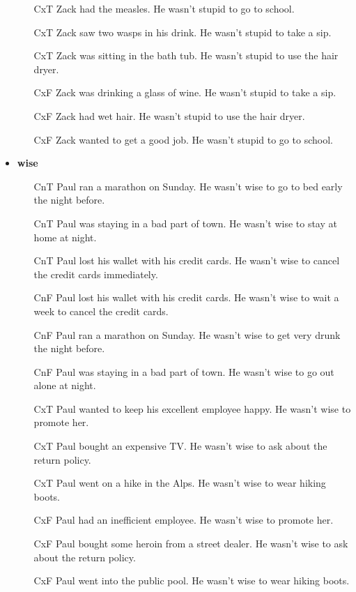 \documentclass[11pt,fleqn]{article}
\newcommand{\6}{\mbox{$[\hspace*{-.6mm}[$}}
\newcommand{\9}{\mbox{$]\hspace*{-.6mm}]$}}
\begin{document}
\begin{itemize}[leftmargin=15pt,itemsep=-1pt]
\begin{enumerate}[leftmargin=15pt,topsep=0pt,itemsep=0pt]
\item[CxT] 	Zack had the measles.	He	wasn't stupid	to go to school.
\item[CxT] 	Zack saw two wasps in his drink.	He	wasn't stupid	to take a sip.
\item[CxT] 	Zack was sitting in the bath tub.	He	wasn't stupid	to use the hair dryer.
\item[CxF] 	Zack was drinking a glass of wine.	He	wasn't stupid	to take a sip.
\item[CxF] 	Zack had wet hair.	He	wasn't stupid	to use the hair dryer.
\item[CxF] 	Zack wanted to get a good job.	He	wasn't stupid	to go to school.

\end{enumerate}

\item {\bf wise}

\begin{enumerate}[leftmargin=15pt,topsep=0pt,itemsep=0pt]


\item[CnT] 	Paul ran a marathon on Sunday.	He	wasn't wise	to go to bed early the night before.
\item[CnT] 	Paul was staying in a bad part of town.	He	wasn't wise	to stay at home at night.
\item[CnT] 	Paul lost his wallet with his credit cards.	He	wasn't wise	to cancel the credit cards immediately.
\item[CnF] 	Paul lost his wallet with his credit cards.	He	wasn't wise	to wait a week to cancel the credit cards.
\item[CnF] 	Paul ran a marathon on Sunday.	He	wasn't wise	to get very drunk the night before.
\item[CnF] 	Paul was staying in a bad part of town.	He	wasn't wise	to go out alone at night.
\item[CxT] 	Paul wanted to keep his excellent employee happy.	He	wasn't wise	to promote her.
\item[CxT] 	Paul bought an expensive TV.	He	wasn't wise	to ask about the return policy.
\item[CxT] 	Paul went on a hike in the Alps.	He	wasn't wise	to wear hiking boots.
\item[CxF] 	Paul had an inefficient employee.	He	wasn't wise	to promote her.
\item[CxF] 	Paul bought some heroin from a street dealer.	He	wasn't wise	to ask about the return policy.
\item[CxF] 	Paul went into the public pool.	He	wasn't wise	to wear hiking boots.

\end{enumerate}

\end{itemize}
\end{document}
